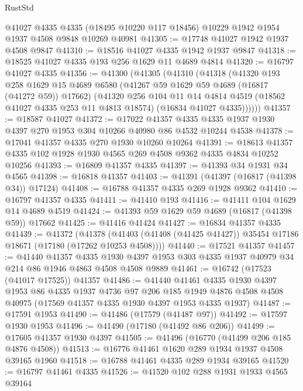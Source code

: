 \begin{lexlean}{RustStd}
\begin{coremodule}
{\begin{coremodule}
{{{{{{{{{{{{{{{{{{{{{{{{{{{{{{{{{{{{{{{{{{{{{{{{{{{{{{{    @41027
    @4335
    @4335
    (@18495 @10220 @117 @18456)
    @10229
    @1942
    @1954
    @1937
    @4508
    @9848
    @10269
    @40981
@41305 := @17748 @41027 @1942 @1937 @4508 @9847
@41310 := @18516 @41027 @4335 @1942 @1937 @9847
@41318 := @18525 @41027 @4335 @193 @256 @1629 @11 @4689 @4814
@41320 := @16797 @41027 @4335
@41356 := @41300
    (@41305
      (@41310
        (@41318
          (@41320
            @193
            @258
            @1629
            @15
            @4689
            @6580
            (@41267 @59 @1629 @59 @4689 (@16817 (@41272 @59)) @17662)
            (@41320
              @256
              @104
              @11
              @14
              @4814
              @4519
              (@18562 @41027 @4335 @253 @11 @4813 @18574)
              (@16834 @41027 @4335))))))
@41357 := @18587 @41027
@41372 := @17022
    @41357
    @4335
    @4335
    @1937
    @1930
    @4397
    @270
    @1953
    @304
    @10266
    @40980
    @86
    @4532
    @10244
    @4538
@41378 := @17041 @41357 @4335 @270 @1930 @10260 @10264
@41391 := @18613 @41357 @4335 @102 @1928 @1930 @4565 @269 @4508 @9362 @4335 @4834 @10252 @10256
@41393 := @16809 @41357 @4335
@41397 := @41393 @34 @1931 @34 @4565
@41398 := @16818 @41357
@41403 := @41391 (@41397 (@16817 (@41398 @34)) @17124)
@41408 := @16788 @41357 @4335 @269 @1928 @9362
@41410 := @16797 @41357 @4335
@41411 := @41410 @193
@41416 := @41411 @104 @1629 @14 @4689 @4519
@41424 := @41393 @59 @1629 @59 @4689 (@16817 (@41398 @59)) @17662
@41425 := @41416 @41424
@41427 := @16834 @41357 @4335
@41439 := @41372
    (@41378 (@41403 (@41408 (@41425 @41427)) @35454 @17186 @18671 (@17180 (@17262 @10253 @4508))))
@41440 := @17521 @41357
@41457 := @41440
    @41357
    @4335
    @1930
    @4397
    @1953
    @303
    @4335
    @1937
    @40979
    @34
    @214
    @86
    @1946
    @4863
    @4508
    @4508
    @9889
@41461 := @16742 (@17523 (@41017 @17525)) @41357
@41486 := @41440
    @41461
    @4335
    @1930
    @4397
    @1953
    @86
    @4335
    @1937
    @4736
    @97
    @206
    @185
    @1949
    @4876
    @4508
    @4508
    @40975
    (@17569 @41357 @4335 @1930 @4397 @1953 @4335 @1937)
@41487 := @17591 @1953
@41490 := @41486 (@17579 (@41487 @97))
@41492 := @17597 @1930 @1953
@41496 := @41490 (@17180 (@41492 @86 @206))
@41499 := @17605 @41357 @1930 @4397
@41505 := @41496 (@16770 (@41499 @206 @185 @4876 @4508))
@41513 := @16776 @41461 @1620 @289 @1934 @1937 @4508 @39165 @1960
@41518 := @16788 @41461 @4335 @289 @1934 @39165
@41520 := @16797 @41461 @4335
@41526 := @41520 @102 @288 @1931 @1933 @4565 @39164
}}}}}}}}}}}}}}}}}}}}}}}}}}}}}}}}}}}}}}}}}}}}}}}}}}}}}}}
\end{coremodule}}
\end{coremodule}
\end{lexlean}
